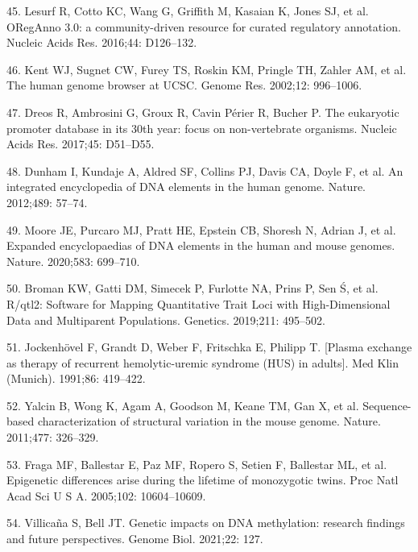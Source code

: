 \documentclass[10pt,letterpaper]{article}
\newenvironment{cslreferences}%
  {}%
  {\par}
\begin{document}
\begin{cslreferences}
\leavevmode\hypertarget{ref-pmid26578589}{}%
45. Lesurf R, Cotto KC, Wang G, Griffith M, Kasaian K, Jones SJ, et al.
ORegAnno 3.0: a community-driven resource for curated regulatory
annotation. Nucleic Acids Res. 2016;44: D126--132.

\leavevmode\hypertarget{ref-pmid12045153}{}%
46. Kent WJ, Sugnet CW, Furey TS, Roskin KM, Pringle TH, Zahler AM, et
al. The human genome browser at UCSC. Genome Res. 2002;12: 996--1006.

\leavevmode\hypertarget{ref-pmid27899657}{}%
47. Dreos R, Ambrosini G, Groux R, Cavin Périer R, Bucher P. The
eukaryotic promoter database in its 30th year: focus on non-vertebrate
organisms. Nucleic Acids Res. 2017;45: D51--D55.

\leavevmode\hypertarget{ref-pmid22955616}{}%
48. Dunham I, Kundaje A, Aldred SF, Collins PJ, Davis CA, Doyle F, et
al. An integrated encyclopedia of DNA elements in the human genome.
Nature. 2012;489: 57--74.

\leavevmode\hypertarget{ref-pmid32728249}{}%
49. Moore JE, Purcaro MJ, Pratt HE, Epstein CB, Shoresh N, Adrian J, et
al. Expanded encyclopaedias of DNA elements in the human and mouse
genomes. Nature. 2020;583: 699--710.

\leavevmode\hypertarget{ref-pmid30591514}{}%
50. Broman KW, Gatti DM, Simecek P, Furlotte NA, Prins P, Sen Ś, et al.
R/qtl2: Software for Mapping Quantitative Trait Loci with
High-Dimensional Data and Multiparent Populations. Genetics. 2019;211:
495--502.

\leavevmode\hypertarget{ref-pmid1921910}{}%
51. Jockenhövel F, Grandt D, Weber F, Fritschka E, Philipp T. {[}Plasma
exchange as therapy of recurrent hemolytic-uremic syndrome (HUS) in
adults{]}. Med Klin (Munich). 1991;86: 419--422.

\leavevmode\hypertarget{ref-pmid21921916}{}%
52. Yalcin B, Wong K, Agam A, Goodson M, Keane TM, Gan X, et al.
Sequence-based characterization of structural variation in the mouse
genome. Nature. 2011;477: 326--329.

\leavevmode\hypertarget{ref-pmid16009939}{}%
53. Fraga MF, Ballestar E, Paz MF, Ropero S, Setien F, Ballestar ML, et
al. Epigenetic differences arise during the lifetime of monozygotic
twins. Proc Natl Acad Sci U S A. 2005;102: 10604--10609.

\leavevmode\hypertarget{ref-pmid33931130}{}%
54. Villicaña S, Bell JT. Genetic impacts on DNA methylation: research
findings and future perspectives. Genome Biol. 2021;22: 127.


\end{cslreferences}
\end{document}
